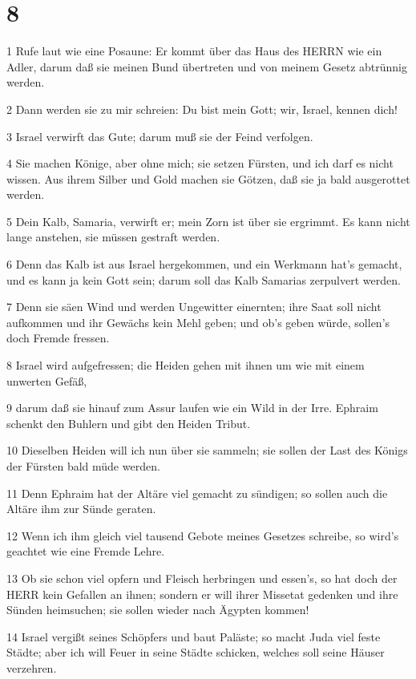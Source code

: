 \chapter{8}

\par 1 Rufe laut wie eine Posaune: Er kommt über das Haus des HERRN wie ein Adler, darum daß sie meinen Bund übertreten und von meinem Gesetz abtrünnig werden.
\par 2 Dann werden sie zu mir schreien: Du bist mein Gott; wir, Israel, kennen dich!
\par 3 Israel verwirft das Gute; darum muß sie der Feind verfolgen.
\par 4 Sie machen Könige, aber ohne mich; sie setzen Fürsten, und ich darf es nicht wissen. Aus ihrem Silber und Gold machen sie Götzen, daß sie ja bald ausgerottet werden.
\par 5 Dein Kalb, Samaria, verwirft er; mein Zorn ist über sie ergrimmt. Es kann nicht lange anstehen, sie müssen gestraft werden.
\par 6 Denn das Kalb ist aus Israel hergekommen, und ein Werkmann hat's gemacht, und es kann ja kein Gott sein; darum soll das Kalb Samarias zerpulvert werden.
\par 7 Denn sie säen Wind und werden Ungewitter einernten; ihre Saat soll nicht aufkommen und ihr Gewächs kein Mehl geben; und ob's geben würde, sollen's doch Fremde fressen.
\par 8 Israel wird aufgefressen; die Heiden gehen mit ihnen um wie mit einem unwerten Gefäß,
\par 9 darum daß sie hinauf zum Assur laufen wie ein Wild in der Irre. Ephraim schenkt den Buhlern und gibt den Heiden Tribut.
\par 10 Dieselben Heiden will ich nun über sie sammeln; sie sollen der Last des Königs der Fürsten bald müde werden.
\par 11 Denn Ephraim hat der Altäre viel gemacht zu sündigen; so sollen auch die Altäre ihm zur Sünde geraten.
\par 12 Wenn ich ihm gleich viel tausend Gebote meines Gesetzes schreibe, so wird's geachtet wie eine Fremde Lehre.
\par 13 Ob sie schon viel opfern und Fleisch herbringen und essen's, so hat doch der HERR kein Gefallen an ihnen; sondern er will ihrer Missetat gedenken und ihre Sünden heimsuchen; sie sollen wieder nach Ägypten kommen!
\par 14 Israel vergißt seines Schöpfers und baut Paläste; so macht Juda viel feste Städte; aber ich will Feuer in seine Städte schicken, welches soll seine Häuser verzehren.

